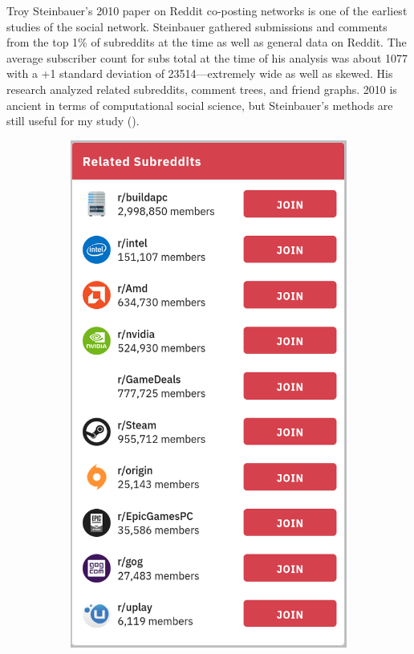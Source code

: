 \documentclass[12pt, a4paper]{article}
\begin{document}
Troy Steinbauer's 2010 paper on Reddit co-posting networks is one of the earliest studies of the social network. Steinbauer gathered submissions and comments from the top 1\% of subreddits at the time as well as general data on Reddit. The average subscriber count for subs total at the time of his analysis was about 1077 with a +1 standard deviation of 23514---extremely wide as well as skewed. His research analyzed related subreddits, comment trees, and friend graphs. 2010 is ancient in terms of computational social science, but Steinbauer's methods are still useful for my study (\cite{tbower_2011}).

\begin{figure}[ht!]
  \centering
  \begin{subfigure}[b]{0.4\linewidth}
    \includegraphics[width=\linewidth]{related_pcgaming.png}

\end{subfigure}
\end{figure}
\end{document}
